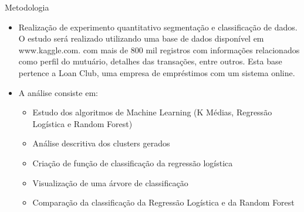 \documentclass[final,hyperref={pdfpagelabels=false, brazil}]{beamer}
\begin{document}
\begin{frame}[t]
\begin{columns}[t]
\begin{column}{.465\textwidth}



\begin{block}{Metodologia}


\begin{itemize}
\item Realização de experimento quantitativo  segmentação e classificação de dados. O estudo será realizado utilizando uma base de dados disponível em www.kaggle.com. com mais de 800 mil registros com informações relacionados como perfil do mutuário, detalhes das transações, entre outros. Esta base pertence a Loan Club, uma empresa de empréstimos com um sistema online.

\item A análise consiste em:
\begin{itemize}
\item Estudo dos algoritmos de Machine Learning (K Médias, Regressão Logística e Random Forest)
\item Análise descritiva dos clusters gerados
\item Criação de função de classificação da regressão logística
\item Visualização de uma árvore de classificação
\item Comparação da classificação da Regressão Logística e da Random Forest
\end{itemize}
\end{itemize}

\end{block}



\end{column}
\end{columns}
\end{frame}
\end{document}
